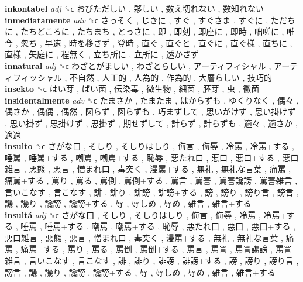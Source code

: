 \textbf{inkontabel} \emph{adj}  ␝ϲ   おびただしい ,  夥しい ,  数え切れない ,  数知れない   \\
\textbf{inmediatamente} \emph{adv}  ␝ϲ   さっそく ,  じきに ,  すぐ ,  すぐさま ,  すぐに ,  ただちに ,  たちどころに ,  たちまち ,  とっさに ,  即 ,  即刻 ,  即座に ,  即時 ,  咄嗟に ,  唯今 ,  忽ち ,  早速 ,  時を移さず ,  登時 ,  直ぐ ,  直ぐと ,  直ぐに ,  直ぐ様 ,  直ちに ,  直様 ,  矢庭に ,  程無く ,  立ち所に ,  立所に ,  透かさず   \\
\textbf{innatural} \emph{adj}  ␝ϲ   わざとがましい ,  わざとらしい ,  アーティフィシャル ,  アーティフィッシャル ,  不自然 ,  人工的 ,  人為的 ,  作為的 ,  大層らしい ,  技巧的   \\
\textbf{insekto} ␝ϲ   はい芽 ,  ばい菌 ,  伝染毒 ,  微生物 ,  細菌 ,  胚芽 ,  虫 ,  黴菌   \\
\textbf{insidentalmente} \emph{adv}  ␝ϲ   たまさか ,  たまたま ,  はからずも ,  ゆくりなく ,  偶々 ,  偶さか ,  偶偶 ,  偶然 ,  図らず ,  図らずも ,  巧まずして ,  思いがけず ,  思い掛けず ,  思い掛ず ,  思掛けず ,  思掛ず ,  期せずして ,  計らず ,  計らずも ,  適々 ,  適さか ,  適適   \\
\textbf{insulto} ␝ϲ   さがな口 ,  そしり ,  そしりはしり ,  侮言 ,  侮辱 ,  冷罵 ,  冷罵+する ,  唾罵 ,  唾罵+する ,  嘲罵 ,  嘲罵+する ,  恥辱 ,  悪たれ口 ,  悪口 ,  悪口+する ,  悪口雑言 ,  悪態 ,  悪言 ,  憎まれ口 ,  毒突く ,  漫罵+する ,  無礼 ,  無礼な言葉 ,  痛罵 ,  痛罵+する ,  罵り ,  罵る ,  罵倒 ,  罵倒+する ,  罵言 ,  罵詈 ,  罵詈讒謗 ,  罵詈雑言 ,  言いこなす ,  言こなす ,  誹 ,  誹り ,  誹謗 ,  誹謗+する ,  謗 ,  謗り ,  謗り言 ,  謗言 ,  譏 ,  譏り ,  讒謗 ,  讒謗+する ,  辱 ,  辱しめ ,  辱め ,  雑言 ,  雑言+する   \\
\textbf{insultá} \emph{adj}  ␝ϲ   さがな口 ,  そしり ,  そしりはしり ,  侮言 ,  侮辱 ,  冷罵 ,  冷罵+する ,  唾罵 ,  唾罵+する ,  嘲罵 ,  嘲罵+する ,  恥辱 ,  悪たれ口 ,  悪口 ,  悪口+する ,  悪口雑言 ,  悪態 ,  悪言 ,  憎まれ口 ,  毒突く ,  漫罵+する ,  無礼 ,  無礼な言葉 ,  痛罵 ,  痛罵+する ,  罵り ,  罵る ,  罵倒 ,  罵倒+する ,  罵言 ,  罵詈 ,  罵詈讒謗 ,  罵詈雑言 ,  言いこなす ,  言こなす ,  誹 ,  誹り ,  誹謗 ,  誹謗+する ,  謗 ,  謗り ,  謗り言 ,  謗言 ,  譏 ,  譏り ,  讒謗 ,  讒謗+する ,  辱 ,  辱しめ ,  辱め ,  雑言 ,  雑言+する   \\
